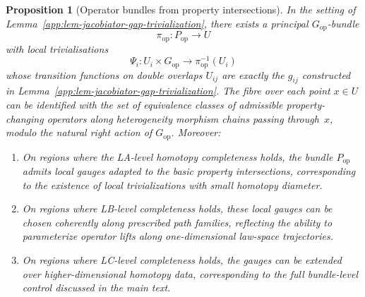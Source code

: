 \documentclass[11pt]{book}
\theoremstyle{plain}
\newtheorem{proposition}[theorem]{Proposition}
\theoremstyle{definition}
\theoremstyle{remark}
\begin{document}
\begin{proposition}[Operator bundles from property intersections]
\label{app:prop-operator-bundle-from-property-intersections}
In the setting of Lemma~\ref{app:lem-jacobiator-gap-trivialization},
there exists a principal $G_{\mathrm{op}}$-bundle
\[
  \pi_{\mathrm{op}} \colon P_{\mathrm{op}} \longrightarrow U
\]
with local trivialisations
\[
  \Psi_i \colon U_i \times G_{\mathrm{op}} \longrightarrow
  \pi_{\mathrm{op}}^{-1}(U_i)
\]
whose transition functions on double overlaps $U_{ij}$ are exactly the
$g_{ij}$ constructed in Lemma~\ref{app:lem-jacobiator-gap-trivialization}.
The fibre over each point $x \in U$ can be identified with the set of
equivalence classes of admissible property-changing operators along
heterogeneity morphism chains passing through~$x$, modulo the natural
right action of $G_{\mathrm{op}}$. Moreover:
\begin{enumerate}
  \item On regions where the LA-level homotopy completeness holds, the
        bundle $P_{\mathrm{op}}$ admits local gauges adapted to the
        basic property intersections, corresponding to the existence of
        local trivializations with small homotopy diameter.
  \item On regions where LB-level completeness holds, these local
        gauges can be chosen coherently along prescribed path families,
        reflecting the ability to parameterize operator lifts along
        one-dimensional law-space trajectories.
  \item On regions where LC-level completeness holds, the gauges can be
        extended over higher-dimensional homotopy data, corresponding
        to the full bundle-level control discussed in the main text.
\end{enumerate}
\end{proposition}
\end{document}
